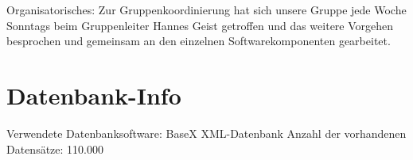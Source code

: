 \documentclass[10pt,a4paper]{scrartcl}
\begin{document}
Organisatorisches: Zur Gruppenkoordinierung hat sich unsere Gruppe jede Woche Sonntags beim Gruppenleiter Hannes Geist getroffen und das weitere Vorgehen besprochen und gemeinsam an den einzelnen Softwarekomponenten gearbeitet.

\section{Datenbank-Info}
Verwendete Datenbanksoftware: BaseX XML-Datenbank
Anzahl der vorhandenen Datensätze: 110.000
\end{document}
